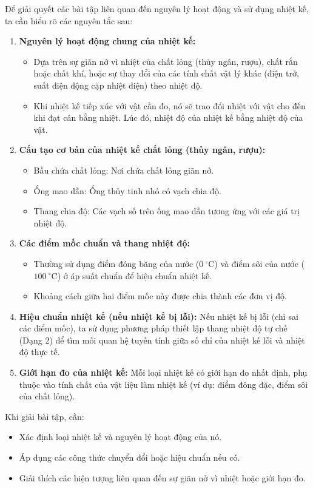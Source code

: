 \begin{phuongphap}
	Để giải quyết các bài tập liên quan đến nguyên lý hoạt động và sử dụng nhiệt kế, ta cần hiểu rõ các nguyên tắc sau:
	\begin{enumerate}
		\item \textbf{Nguyên lý hoạt động chung của nhiệt kế:}
		\begin{itemize}
			\item Dựa trên sự giãn nở vì nhiệt của chất lỏng (thủy ngân, rượu), chất rắn hoặc chất khí, hoặc sự thay đổi của các tính chất vật lý khác (điện trở, suất điện động cặp nhiệt điện) theo nhiệt độ.
			\item Khi nhiệt kế tiếp xúc với vật cần đo, nó sẽ trao đổi nhiệt với vật cho đến khi đạt cân bằng nhiệt. Lúc đó, nhiệt độ của nhiệt kế bằng nhiệt độ của vật.
		\end{itemize}
		\item \textbf{Cấu tạo cơ bản của nhiệt kế chất lỏng (thủy ngân, rượu):}
		\begin{itemize}
			\item Bầu chứa chất lỏng: Nơi chứa chất lỏng giãn nở.
			\item Ống mao dẫn: Ống thủy tinh nhỏ có vạch chia độ.
			\item Thang chia độ: Các vạch số trên ống mao dẫn tương ứng với các giá trị nhiệt độ.
		\end{itemize}
		\item \textbf{Các điểm mốc chuẩn và thang nhiệt độ:}
		\begin{itemize}
			\item Thường sử dụng điểm đóng băng của nước ($0\ ^\circ\mathrm{C}$) và điểm sôi của nước ($100\ ^\circ\mathrm{C}$) ở áp suất chuẩn để hiệu chuẩn nhiệt kế.
			\item Khoảng cách giữa hai điểm mốc này được chia thành các đơn vị độ.
		\end{itemize}
		\item \textbf{Hiệu chuẩn nhiệt kế (nếu nhiệt kế bị lỗi):}
		Nếu nhiệt kế bị lỗi (chỉ sai các điểm mốc), ta sử dụng phương pháp thiết lập thang nhiệt độ tự chế (Dạng 2) để tìm mối quan hệ tuyến tính giữa số chỉ của nhiệt kế lỗi và nhiệt độ thực tế.
		\item \textbf{Giới hạn đo của nhiệt kế:}
		Mỗi loại nhiệt kế có giới hạn đo nhất định, phụ thuộc vào tính chất của vật liệu làm nhiệt kế (ví dụ: điểm đông đặc, điểm sôi của chất lỏng).
	\end{enumerate}
	Khi giải bài tập, cần:
	\begin{itemize}
		\item Xác định loại nhiệt kế và nguyên lý hoạt động của nó.
		\item Áp dụng các công thức chuyển đổi hoặc hiệu chuẩn nếu có.
		\item Giải thích các hiện tượng liên quan đến sự giãn nở vì nhiệt hoặc giới hạn đo.
	\end{itemize}
\end{phuongphap}
